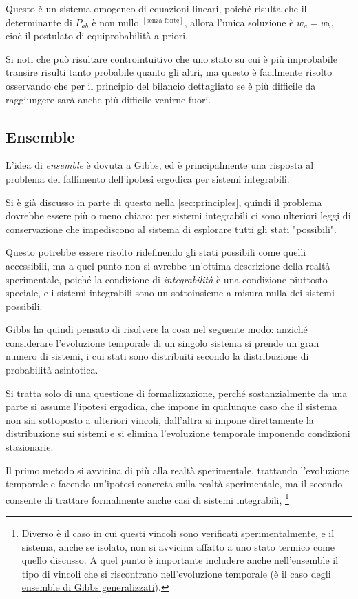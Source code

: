 Questo è un sistema omogeneo di equazioni lineari, poiché risulta che il determinante di $P_{ab}$ è non nullo $^{[\text{senza fonte}]}$, allora l'unica soluzione è $w_a = w_b$, cioè il postulato di equiprobabilità a priori.
\newline

Si noti che può risultare controintuitivo che uno stato su cui è più improbabile transire risulti tanto probabile quanto gli altri, ma questo è facilmente risolto osservando che per il principio del bilancio dettagliato se è più difficile da raggiungere sarà anche più difficile venirne fuori.

\subsection{Ensemble}
L'idea di \textit{ensemble} è dovuta a Gibbs, ed è principalmente una risposta al problema del fallimento dell'ipotesi ergodica per sistemi integrabili.
\newline

Si è già discusso in parte di questo nella \cref{sec:principles}, quindi il problema dovrebbe essere più o meno chiaro: per sistemi integrabili ci sono ulteriori leggi di conservazione che impediscono al sistema di esplorare tutti gli stati "possibili".

Questo potrebbe essere risolto ridefinendo gli stati possibili come quelli accessibili, ma a quel punto non si avrebbe un'ottima descrizione della realtà sperimentale, poiché la condizione di \textit{integrabilità} è una condizione piuttosto speciale, e i sistemi integrabili sono un sottoinsieme a misura nulla dei sistemi possibili.

Gibbs ha quindi pensato di risolvere la cosa nel seguente modo: anziché considerare l'evoluzione temporale di un singolo sistema si prende un gran numero di sistemi, i cui stati sono distribuiti secondo la distribuzione di probabilità asintotica.

Si tratta solo di una questione di formalizzazione, perché sostanzialmente da una parte si assume l'ipotesi ergodica, che impone in qualunque caso che il sistema non sia sottoposto a ulteriori vincoli, dall'altra si impone direttamente la distribuzione sui sistemi e si elimina l'evoluzione temporale imponendo condizioni stazionarie.

Il primo metodo si avvicina di più alla realtà sperimentale, trattando l'evoluzione temporale e facendo un'ipotesi concreta sulla realtà sperimentale, ma il secondo consente di trattare formalmente anche casi di sistemi integrabili,
\footnote{Diverso è il caso in cui questi vincoli sono verificati sperimentalmente, e il sistema, anche se isolato, non si avvicina affatto a uno stato termico come quello discusso. A quel punto è importante includere anche nell'ensemble il tipo di vincoli che si riscontrano nell'evoluzione temporale (è il caso degli \href{https://journals.aps.org/pr/abstract/10.1103/PhysRev.106.620}{ensemble di Gibbs generalizzati}).}
\newline

